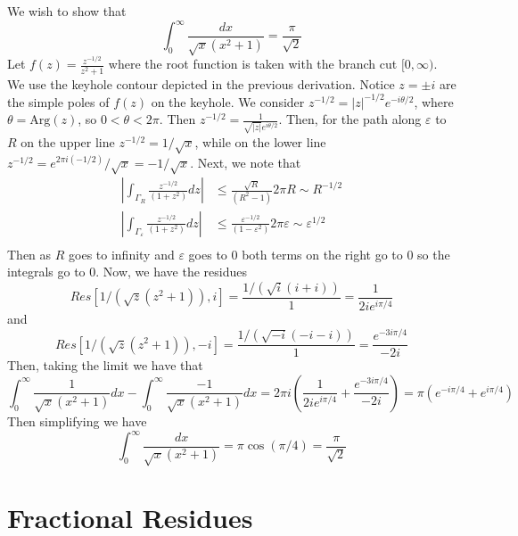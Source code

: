 \documentclass[12pt, a4paper, oneside, openright, titlepage]{book}
\begin{document}
\begin{eg}
    We wish to show that $$\int_0^{\infty}\frac{dx}{\sqrt{x}(x^2+1)} = \frac{\pi}{\sqrt{2}}$$
    Let $f(z) = \frac{z^{-1/2}}{z^2+1}$ where the root function is taken with the branch cut $[0,\infty)$. We use the keyhole contour depicted in the previous derivation. Notice $z = \pm i$ are the simple poles of $f(z)$ on the keyhole. We consider $z^{-1/2} = |z|^{-1/2}e^{-i\theta/2}$, where $\theta = \text{Arg}(z)$, so $0 < \theta < 2\pi$. Then $z^{-1/2} = \frac{1}{\sqrt{|z|}e^{i\theta/2}}$. Then, for the path along $\varepsilon$ to $R$ on the upper line $z^{-1/2} = 1/\sqrt{x}$, while on the lower line $z^{-1/2} = e^{2\pi i(-1/2)}/\sqrt{x} = -1/\sqrt{x}$. Next, we note that \begin{align*}
        \left|\int_{\Gamma_R}\frac{z^{-1/2}}{(1+z^2)}dz\right| &\leq \frac{\sqrt{R}}{(R^2-1)}2\pi R\sim R^{-1/2} \\
        \left|\int_{\Gamma_{\varepsilon}}\frac{z^{-1/2}}{(1+z^2)}dz\right| &\leq \frac{\varepsilon^{-1/2}}{(1-\varepsilon^2)}2\pi \varepsilon\sim \varepsilon^{1/2} \\
    \end{align*}
    Then as $R$ goes to infinity and $\varepsilon$ goes to $0$ both terms on the right go to $0$ so the integrals go to $0$. Now, we have the residues \begin{equation*}
        Res[1/(\sqrt{z}(z^2+1)),i] = \frac{1/(\sqrt{i}(i+i))}{1} = \frac{1}{2ie^{i\pi/4}}
    \end{equation*}
    and \begin{equation*}
        Res[1/(\sqrt{z}(z^2+1)),-i] = \frac{1/(\sqrt{-i}(-i-i))}{1} = \frac{e^{-3i\pi/4}}{-2i} 
    \end{equation*}
    Then, taking the limit we have that \begin{equation*}
        \int_{0}^{\infty}\frac{1}{\sqrt{x}(x^2+1)}dx - \int_0^{\infty}\frac{-1}{\sqrt{x}(x^2+1)}dx = 2\pi i\left(\frac{1}{2ie^{i\pi/4}}+\frac{e^{-3i\pi/4}}{-2i}\right) = \pi \left(e^{-i\pi/4}+e^{i\pi/4}\right)
    \end{equation*}
    Then simplifying we have \begin{equation*}
        \int_0^{\infty}\frac{dx}{\sqrt{x}(x^2+1)} = \pi\cos(\pi/4) = \frac{\pi}{\sqrt{2}}
    \end{equation*}
\end{eg}
 

\section{Fractional Residues}
\end{document}

